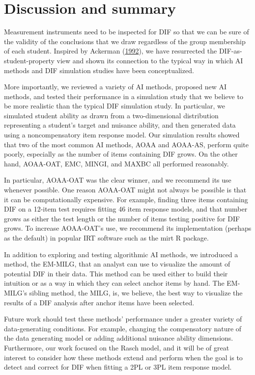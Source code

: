 \documentclass[
  11pt,
]{article}
\begin{document}
\hypertarget{discussion-and-summary}{%
\section{Discussion and summary}\label{discussion-and-summary}}

Measurement instruments need to be inspected for DIF so that we can be sure of the validity of the conclusions that we draw regardless of the group membership of each student. Inspired by Ackerman (\protect\hyperlink{ref-ackerman1992didactic}{1992}), we have resurrected the DIF-as-student-property view and shown its connection to the typical way in which AI methods and DIF simulation studies have been conceptualized.

More importantly, we reviewed a variety of AI methods, proposed new AI methods, and tested their performance in a simulation study that we believe to be more realistic than the typical DIF simulation study. In particular, we simulated student ability as drawn from a two-dimensional distribution representing a student's target and nuisance ability, and then generated data using a noncompensatory item response model. Our simulation results showed that two of the most common AI methods, AOAA and AOAA-AS, perform quite poorly, especially as the number of items containing DIF grows. On the other hand, AOAA-OAT, EMC, MINGI, and MAXBC all performed reasonably.

In particular, AOAA-OAT was the clear winner, and we recommend its use whenever possible. One reason AOAA-OAT might not always be possible is that it can be computationally expensive. For example, finding three items containing DIF on a 12-item test requires fitting 46 item response models, and that number grows as either the test length or the number of items testing positive for DIF grows. To increase AOAA-OAT's use, we recommend its implementation (perhaps as the default) in popular IRT software such as the mirt R package.

In addition to exploring and testing algorithmic AI methods, we introduced a method, the EM-MILG, that an analyst can use to visualize the amount of potential DIF in their data. This method can be used either to build their intuition or as a way in which they can select anchor items by hand. The EM-MILG's sibling method, the MILG, is, we believe, the best way to visualize the results of a DIF analysis after anchor items have been selected.

Future work should test these methods' performance under a greater variety of data-generating conditions. For example, changing the compensatory nature of the data generating model or adding additional nuisance ability dimensions. Furthermore, our work focused on the Rasch model, and it will be of great interest to consider how these methods extend and perform when the goal is to detect and correct for DIF when fitting a 2PL or 3PL item response model.
\end{document}
